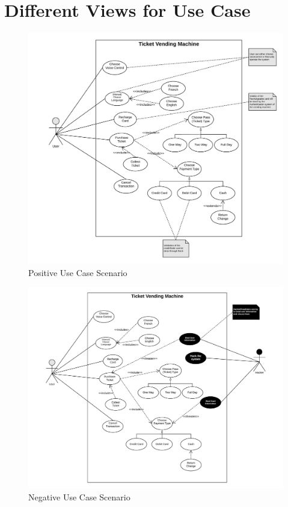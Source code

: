 \documentclass[11pt,oneside]{book}
\begin{document}
\section{Different Views for Use Case}


\begin{figure}[htp]
\includegraphics[width = 15cm]{images/image4.jpg} 
    \centering
    \caption{Positive Use Case Scenario}
\end{figure}
\clearpage

\begin{figure}[htp]
\includegraphics[width = 18cm]{images/image6.jpg} 
    \centering
    \caption{Negative Use Case Scenario}
\end{figure}
\clearpage
\end{document}
